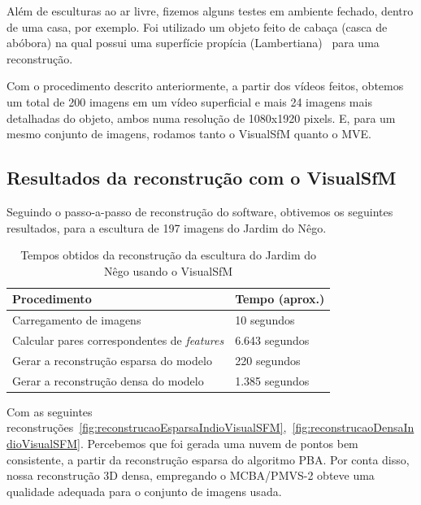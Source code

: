 Além de esculturas ao ar livre, fizemos alguns testes em ambiente fechado, dentro de uma casa, por exemplo. Foi utilizado um objeto feito de cabaça (casca de abóbora) na qual possui uma superfície propícia (Lambertiana)~\cite{basri2003lambertian} para uma reconstrução.

Com o procedimento descrito anteriormente, a partir dos vídeos feitos, obtemos um total de 200 imagens em um vídeo superficial e mais 24 imagens mais detalhadas do objeto, ambos numa resolução de 1080x1920 pixels. E, para um mesmo conjunto de imagens, rodamos tanto o VisualSfM quanto o MVE.

\subsection{Resultados da reconstrução com o VisualSfM}

Seguindo o passo-a-passo de reconstrução do software, obtivemos os seguintes resultados, para a escultura de 197 imagens do Jardim do Nêgo.

\begin{table}[h!]
\caption{Tempos obtidos da reconstrução da escultura do Jardim do Nêgo usando o VisualSfM}
\label{tab:temposSfMJardimDoNego}
\begin{tabular}{|l|p{4.7cm}|}
\hline
Procedimento & Tempo (aprox.) \\ \hline
Carregamento de imagens & 10 segundos \\ \hline
Calcular pares correspondentes de \emph{features} & 6.643 segundos \\ \hline
Gerar a reconstrução esparsa do modelo & 220 segundos \\ \hline
Gerar a reconstrução densa do modelo & 1.385 segundos \\ \hline
\end{tabular}
\end{table}

Com as seguintes reconstruções~\ref{fig:reconstrucaoEsparsaIndioVisualSFM},~\ref{fig:reconstrucaoDensaIndioVisualSFM}.
Percebemos que foi gerada uma nuvem de pontos bem consistente, a partir da reconstrução esparsa do algoritmo PBA.
Por conta disso, nossa reconstrução 3D densa, empregando o MCBA/PMVS-2 obteve uma qualidade adequada para o conjunto de imagens usada.

